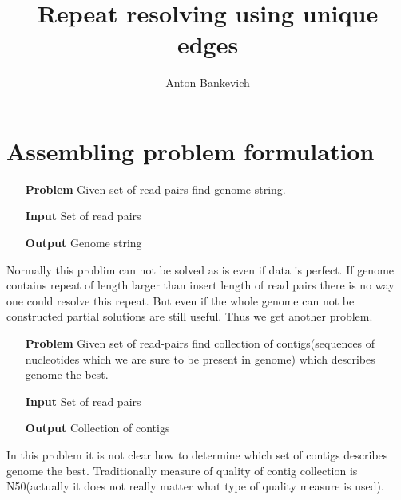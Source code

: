 \documentclass[a4paper,10pt]{article}
\title{Repeat resolving using unique edges}
\author{Anton Bankevich}
\begin{document}
\newtheorem{defin}{Definition}
\newtheorem{prop}{Proposition}

\maketitle

\section{Assembling problem formulation}

\begin{itemize}
\item[\bf Problem] Given set of read-pairs find genome string.
\item[\bf Input] Set of read pairs
\item[\bf Output] Genome string
\end{itemize}

Normally this problim can not be solved as is even if data is perfect. If genome contains repeat of length larger than insert length of read pairs there is no way one could resolve this repeat. But even if the whole genome can not be constructed partial solutions are still useful. Thus we get another problem.

\begin{itemize}
\item[\bf Problem] Given set of read-pairs find collection of contigs(sequences of nucleotides which we are sure to be present in genome) which describes genome the best.
\item[\bf Input] Set of read pairs
\item[\bf Output] Collection of contigs
\end{itemize}

In this problem it is not clear how to determine which set of contigs describes genome the best. Traditionally measure of quality of contig collection is N50(actually it does not really matter what type of quality measure is used).
\end{document}
